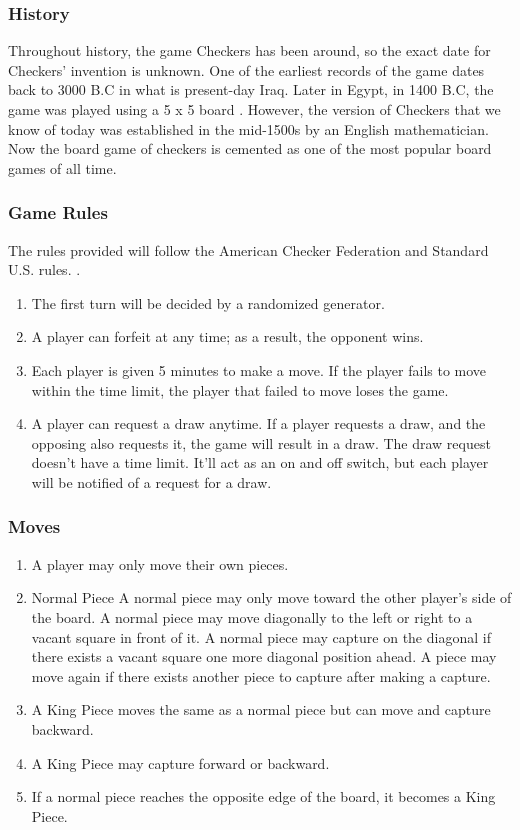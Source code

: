 \documentclass[10pt]{article}
\begin{document}
\subsubsection{History}

Throughout history, the game Checkers has been around, so the exact date for Checkers' 
invention is unknown. One of the earliest records of the game dates back to 3000 B.C in what 
is present-day Iraq. Later in Egypt, in 1400 B.C, the game was played using a 5 x 5 board \cite{historyCheckers}. 
However, the version of Checkers that we know of today was established in the mid-1500s by an English mathematician. 
Now the board game of checkers is cemented as one of the most popular board games of all time. 
\subsubsection{Game Rules}
    The rules provided will follow the American Checker Federation and Standard U.S. rules. \cite {checkersFoundation}.
    \begin{enumerate}
    \item The first turn will be decided by a randomized generator.
    \item A player can forfeit at any time; as a result, the opponent wins.
    \item Each player is given 5 minutes to make a move. If the player fails to move within the time limit, the player that failed to move loses the game.
    \item A player can request a draw anytime. If a player requests a draw, and the opposing also requests it, the game will result in a draw. The draw request doesn’t have a time limit. It’ll act as an on and off switch, but each player will be notified of a request for a draw.
    \end{enumerate}
\subsubsection{Moves} 
\begin{enumerate}
    \item A player may only move their own pieces.
    \item Normal Piece
        \subitem A normal piece may only move toward the other player's side of the board.
        \subitem A normal piece may move diagonally to the left or right to a vacant square in front of it.
        \subitem A normal piece may capture on the diagonal if there exists a vacant square one more diagonal position ahead.
            \subsubitem A piece may move again if there exists another piece to capture after making a capture.
    \item A King Piece moves the same as a normal piece but can move and capture backward.
    \item A King Piece may capture forward or backward.
    \item If a normal piece reaches the opposite edge of the board, it becomes a King Piece.
\end{enumerate}   
\end{document}
